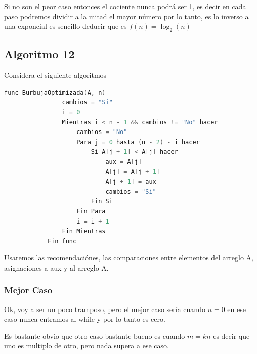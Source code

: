 \documentclass[12pt, fleqn]{article}                            %
\theoremstyle{break}                                            %
\begin{document}
            Si no son el peor caso entonces el cociente nunca podrá ser 1, es decir en cada paso podremos
            dividir a la mitad el mayor número por lo tanto, es lo inverso a una exponcial es sencillo deducir
            que es $f(n) = \log_2(n)$



    \clearpage
    \subsection{Algoritmo 12}

        Considera el siguiente algoritmos
        \begin{lstlisting}[language=C, gobble=12, basicstyle=\small\color{white}]
            func BurbujaOptimizada(A, n)
                cambios = "Si"
                i = 0
                Mientras i < n - 1 && cambios != "No" hacer 
                    cambios = "No"
                    Para j = 0 hasta (n - 2) - i hacer
                        Si A[j + 1] < A[j] hacer    
                            aux = A[j]
                            A[j] = A[j + 1]
                            A[j + 1] = aux
                            cambios = "Si"
                        Fin Si             
                    Fin Para
                    i = i + 1
                Fin Mientras
            Fin func
        \end{lstlisting}

        Usaremos las recomendaciónes, las comparaciones entre elementos del arreglo A, asignaciones
        a aux y al arreglo A.

        \subsubsection{Mejor Caso}

            Ok, voy a ser un poco tramposo, pero el mejor caso sería cuando $n = 0$
            en ese caso nunca entramos al while y por lo tanto es cero.

            Es bastante obvio que otro caso bastante bueno es cuando $ m = kn$ es decir
            que uno es multiplo de otro, pero nada supera a ese caso.
\end{document}
